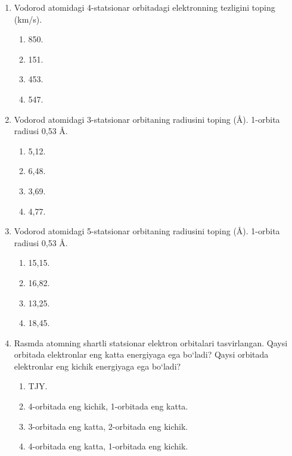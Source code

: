 \begin{enumerate}
\item Vodorod atomidagi 4-statsionar orbitadagi elektronning tezligini toping (km/s).
\begin{enumerate}[label=\Alph*)]
\item 850.
\item 151.
\item 453.
\item 547.
\end{enumerate}

\item Vodorod atomidagi 3-statsionar orbitaning radiusini toping (\AA). 1-orbita radiusi 0,53 \AA.
\begin{enumerate}[label=\Alph*)]
\item 5,12.
\item 6,48.
\item 3,69.
\item 4,77.
\end{enumerate}

\item Vodorod atomidagi 5-statsionar orbitaning radiusini toping (\AA). 1-orbita radiusi 0,53 \AA.
\begin{enumerate}[label=\Alph*)]
\item 15,15.
\item 16,82.
\item 13,25.
\item 18,45.
\end{enumerate}

\item Rasmda atomning shartli statsionar elektron orbitalari tasvirlangan. Qaysi orbitada elektronlar eng katta energiyaga ega bo‘ladi? Qaysi orbitada elektronlar eng kichik energiyaga ega bo‘ladi?

\begin{center}
\end{center}

\begin{enumerate}[label=\Alph*)]
\item TJY.
\item 4-orbitada eng kichik, 1-orbitada eng katta.
\item 3-orbitada eng katta, 2-orbitada eng kichik.
\item 4-orbitada eng katta, 1-orbitada eng kichik.
\end{enumerate}


\end{enumerate}
